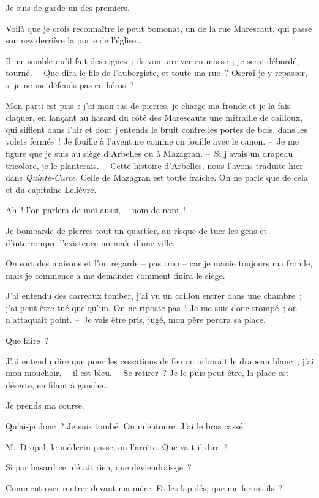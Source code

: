 \documentclass[french,twoside]{book} %
\begin{document}
\bigbreak
\noindent Je suis de garde un des premiers.\par
Voilà que je crois reconnaître le petit Somonat, un de la rue Marescaut, qui passe son nez derrière la porte de l’église…\par
Il me semble qu’il fait des signes ; ils vont arriver en masse ; je serai débordé, tourné. – Que dira le fils de l’aubergiste, et toute ma rue ? Oserai-je y repasser, si je ne me défends pas en héros ?\par
Mon parti est pris : j’ai mon tas de pierres, je charge ma fronde et je la fais claquer, en lançant au hasard du côté des Marescauts une mitraille de cailloux, qui sifflent dans l’air et dont j’entends le bruit contre les portes de bois, dans les volets fermés ! Je fouille à l’aventure comme on fouille avec le canon. – Je me figure que je suis au siège d’Arbelles ou à Mazagran. – Si j’avais un drapeau tricolore, je le planterais. – Cette histoire d’Arbelles, nous l’avons traduite hier dans \emph{Quinte-Curce}. Celle de Mazagran est toute fraîche. On ne parle que de cela et du capitaine Lelièvre.\par
Ah ! l’on parlera de moi aussi, – nom de nom !\par
Je bombarde de pierres tout un quartier, au risque de tuer les gens et d’interrompre l’existence normale d’une ville.\par
On sort des maisons et l’on regarde – pas trop – car je manie toujours ma fronde, mais je commence à me demander comment finira le siège.\par
J’ai entendu des carreaux tomber, j’ai vu un caillou entrer dans une chambre ; j’ai peut-être tué quelqu’un. On ne riposte pas ! Je me suis donc trompé ; on n’attaquait point. – Je vais être pris, jugé, mon père perdra sa place.\par
Que faire ?\par
J’ai entendu dire que pour les cessations de feu on arborait le drapeau blanc ; j’ai mon mouchoir, – il est bleu. – Se retirer ? Je le puis peut-être, la place est déserte, en filant à gauche…\par
Je prends ma course.\par
\bigbreak
\noindent Qu’ai-je donc ? Je suis tombé. On m’entoure. J’ai le bras cassé.\par
M. Dropal, le médecin passe, on l’arrête. Que va-t-il dire ?\par
Si par hasard ce n’était rien, que deviendrais-je ?\par
Comment oser rentrer devant ma mère. Et les lapidés, que me feront-ils ?\par
\end{document}

